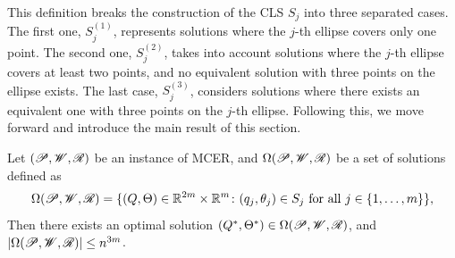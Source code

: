 This definition breaks the construction of the CLS $S_j$ into three separated cases. The first one, $S_j^{(1)}$, represents solutions where the $j$-th ellipse covers only one point. The second one, $S_j^{(2)}$, takes into account solutions where the $j$-th ellipse covers at least two points, and no equivalent solution with three points on the ellipse exists. The last case, $S_j^{(3)}$, considers solutions where there exists an equivalent one with three points on the $j$-th ellipse. Following this, we move forward and introduce the main result of this section. 

\begin{theorem}\label{th:mcer}
	Let $(\mathscr{P}, \mathscr{W}, \mathscr{R})$ be an instance of MCER, and $\Omega(\mathscr{P}, \mathscr{W}, \mathscr{R})$ be a set of solutions defined as 
	\begin{equation*}\label{eq:omega}
	\Omega(\mathscr{P}, \mathscr{W}, \mathscr{R}) = \{(Q, \Theta)\in \mathbb{R}^{2m}\times\mathbb{R}^m \colon (q_j, \theta_j) \in S_j \textnormal{ for all } j\in\{1, \dots, m\}\},
	\end{equation*}
Then there exists an optimal solution $(Q^*, \Theta^*) \in \Omega(\mathscr{P}, \mathscr{W}, \mathscr{R})$, and $|\Omega(\mathscr{P}, \mathscr{W}, \mathscr{R})|\le n^{3m}$.
\end{theorem}
